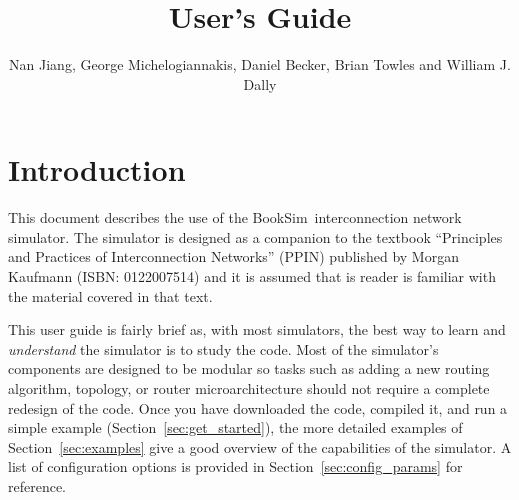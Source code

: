 \documentclass[11pt]{article}
\author{Nan Jiang, George Michelogiannakis, Daniel Becker, Brian Towles and William J. Dally}
\title{\simname 2.0 User's Guide}
\newcommand{\simname}{BookSim~}
\begin{document}
\maketitle
\tableofcontents

\pagestyle{fancy}
\renewcommand{\sectionmark}[1]{\markright{\thesection\ #1}}
\fancyhf{} %
\fancyhead[LE,RO]{\bfseries\thepage}
\fancyhead[LO]{\bfseries\rightmark}
\fancyhead[RE]{\bfseries\leftmark}
\renewcommand{\headrulewidth}{0.5pt}
\renewcommand{\footrulewidth}{0.5pt}
\addtolength{\headheight}{0.5pt} %
\cfoot{\small\today}
\fancypagestyle{plain}{%
    \fancyhf{} %
    \renewcommand{\headrulewidth}{0pt} %
    \renewcommand{\footrulewidth}{0pt} %
} 



\newenvironment{opt_list}[1]{\begin{list}{}{\renewcommand{\makelabel}[1]%
{\texttt{##1}\hfil}\settowidth{\labelwidth}{\texttt{#1}}\setlength{\leftmargin}%
{\labelwidth+\labelsep}}}{\end{list}}

\section{Introduction}

This document describes the use of the \simname interconnection
network simulator.  The simulator is designed as a companion to the
textbook ``Principles and Practices of Interconnection Networks''
(PPIN) published by Morgan Kaufmann (ISBN: 0122007514) and it is
assumed that is reader is familiar with the material covered in that
text.

This user guide is fairly brief as, with most simulators, the best way
to learn and {\it understand} the simulator is to study the code.
Most of the simulator's components are designed to be modular so tasks
such as adding a new routing algorithm, topology, or router
microarchitecture should not require a complete redesign of the code.
Once you have downloaded the code, compiled it, and run a simple
example (Section~\ref{sec:get_started}), the more detailed examples of
Section~\ref{sec:examples} give a good overview of the capabilities of
the simulator.  A list of configuration options is provided in
Section~\ref{sec:config_params} for reference.
\end{document}
